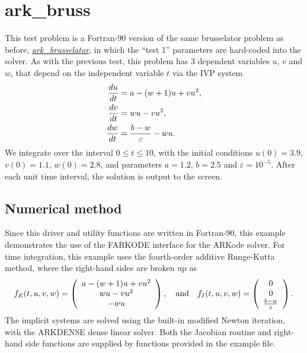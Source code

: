\documentclass[letterpaper,10pt,english]{sphinxmanual}
\begin{document}
\section{ark\_bruss}
\label{f90_serial:ark-bruss}\label{f90_serial:id1}
This test problem is a Fortran-90 version of the same brusselator
problem as before, {\hyperref[c_serial:ark-brusselator]{\emph{ark\_brusselator}}}, in which the ``test 1''
parameters are hard-coded into the solver.  As with the previous test,
this problem has 3 dependent variables $u$, $v$ and
$w$, that depend on the independent variable $t$ via the
IVP system
\begin{gather}
\begin{split}\frac{du}{dt} &= a - (w+1)u + v u^2, \\
\frac{dv}{dt} &= w u - v u^2, \\
\frac{dw}{dt} &= \frac{b-w}{\varepsilon} - w u.\end{split}\notag
\end{gather}
We integrate over the interval $0 \le t \le 10$, with the
initial conditions $u(0) = 3.9$, $v(0) = 1.1$,
$w(0) = 2.8$, and parameters $a=1.2$, $b=2.5$ and
$\varepsilon=10^{-5}$.  After each unit time interval, the
solution is output to the screen.


\subsection{Numerical method}
\label{f90_serial:numerical-method}
Since this driver and utility functions are written in Fortran-90,
this example demonstrates the use of the FARKODE interface for the
ARKode solver.  For time integration, this example uses the
fourth-order additive Runge-Kutta method, where the right-hand sides
are broken up as
\begin{gather}
\begin{split}f_E(t,u,v,w) = \left(\begin{array}{c} a - (w+1)u + v u^2 \\
  w u - v u^2 \\ - w u  \end{array}\right), \quad\text{and}\quad
f_I(t,u,v,w) = \left(\begin{array}{c} 0\\0\\
  \frac{b-w}{\varepsilon}\end{array}\right).\end{split}\notag
\end{gather}
The implicit systems are solved using the built-in modified Newton
iteration, with the ARKDENSE dense linear solver.  Both the Jacobian
routine and right-hand side functions are supplied by functions
provided in the example file.
\end{document}
